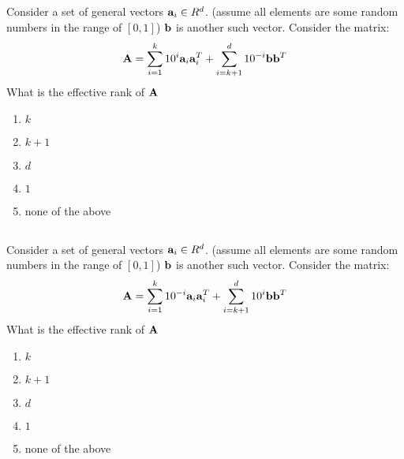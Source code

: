 \begin{frame}
\section{}
  Consider a set of general vectors ${\bf a}_i\in R^d$. (assume all elements are some random numbers in the range of $[0,1]$)
  ${\bf b}$ is another such vector. Consider the matrix:
  \[ {\bf A} = \sum_{i=1}^k 10^{i} {\bf a}_i {\bf a}_i^T + \sum_{i=k+1}^d 10^{-i}{\bf b}{\bf b}^T\]
  What is the effective rank of ${\bf A}$
    \begin{enumerate}[label=(\Alph*)]
     \item $k$
     \item $k+1$
     \item $d$
     \item $1$
     \item none of the above
    \end{enumerate}
\end{frame}

\begin{frame}
\section{}
  Consider a set of general vectors ${\bf a}_i\in R^d$. (assume all elements are some random numbers in the range of $[0,1]$)
  ${\bf b}$ is another such vector. Consider the matrix:
  \[ {\bf A} = \sum_{i=1}^k 10^{-i} {\bf a}_i {\bf a}_i^T + \sum_{i=k+1}^d 10^{i}{\bf b}{\bf b}^T\]
   What is the effective rank of ${\bf A}$
     \begin{enumerate}[label=(\Alph*)]
       \item $k$
       \item $k+1$
       \item $d$
       \item $1$
       \item none of the above
     \end{enumerate}
\end{frame}
